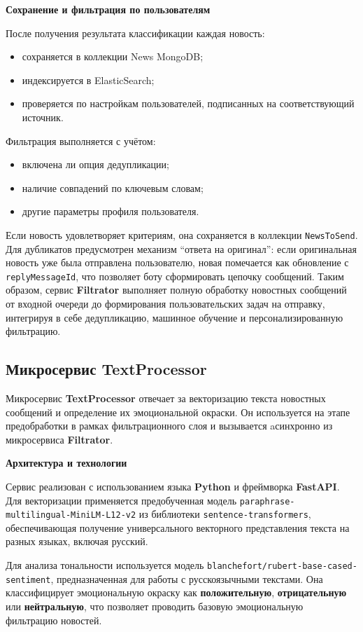 \textbf{Сохранение и фильтрация по пользователям}

После получения результата классификации каждая новость:
\begin{itemize}
    \item сохраняется в коллекции News MongoDB;
    \item индексируется в ElasticSearch;
    \item проверяется по настройкам пользователей, подписанных на соответствующий источник.
\end{itemize}
Фильтрация выполняется с учётом:
\begin{itemize}
    \item включена ли опция дедупликации;
    \item наличие совпадений по ключевым словам;
    \item другие параметры профиля пользователя.
\end{itemize}

Если новость удовлетворяет критериям, она сохраняется в коллекции \texttt{NewsToSend}.
Для дубликатов предусмотрен механизм ``ответа на оригинал'': если оригинальная новость уже была отправлена пользователю, новая помечается как обновление с \texttt{replyMessageId}, что позволяет боту сформировать цепочку сообщений.
Таким образом, сервис \textbf{Filtrator} выполняет полную обработку новостных сообщений от входной очереди до формирования пользовательских задач на отправку, интегрируя в себе дедупликацию, машинное обучение и персонализированную фильтрацию.

\subsection{Микросервис TextProcessor}
Микросервис \textbf{TextProcessor} отвечает за векторизацию текста новостных сообщений и определение их эмоциональной окраски.
Он используется на этапе предобработки в рамках фильтрационного слоя и вызывается aсинхронно из микросервиса \textbf{Filtrator}.

\textbf{Архитектура и технологии}

Сервис реализован с использованием языка \textbf{Python} и фреймворка \textbf{FastAPI}.
Для векторизации применяется предобученная модель \texttt{paraphrase-multilingual-MiniLM-L12-v2} из библиотеки \texttt{sentence-transformers}, обеспечивающая получение универсального векторного представления текста на разных языках, включая русский.

Для анализа тональности используется модель \texttt{blanchefort/rubert-base-cased-sentiment}, предназначенная для работы с русскоязычными текстами.
Она классифицирует эмоциональную окраску как \textbf{положительную}, \textbf{отрицательную} или \textbf{нейтральную}, что позволяет проводить базовую эмоциональную фильтрацию новостей.

